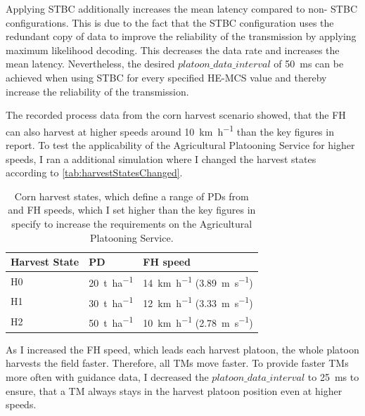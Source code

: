 Applying \ac{STBC} additionally increases the mean latency compared to
non- \ac{STBC} configurations.
This is due to the fact that the \ac{STBC} configuration uses the redundant copy of data to
improve the reliability of the transmission by applying maximum likelihood decoding.
This decreases the data rate and increases
the mean latency.
Nevertheless, the desired $platoon\_data\_interval$ of \SI{50}{\milli\second} can be achieved when using \ac{STBC} for
every specified \ac{HE}-\ac{MCS} value and thereby increase the reliability of the transmission.

The recorded process data from the corn harvest scenario showed, that the \ac{FH} can also harvest at higher speeds around
\SI{10}{\kilo\meter\per\hour} than the key figures in \cite{faustzahlen2018} report.
To test the applicability of the Agricultural Platooning Service for higher speeds, I ran a additional simulation where I changed the
harvest states according to \autoref{tab:harvestStatesChanged}.

\begin{table}[H]
	\centering
	\begin{tabular}{>{\centering}p{2cm}p{4cm}p{4cm}}
		\toprule
		Harvest State & \ac{PD} & \ac{FH} speed\\
		\midrule
		H0 & \SI{20}{\tonne\per\hectare}
        & \SI{14}{\kilo\metre\per\hour} (\SI{3.89}{\metre\per\second}) \\
		H1 & \SI{30}{\tonne\per\hectare}
        & \SI{12}{\kilo\metre\per\hour} (\SI{3.33}{\metre\per\second}) \\
		H2 & \SI{50}{\tonne\per\hectare}
        & \SI{10}{\kilo\metre\per\hour} (\SI{2.78}{\metre\per\second}) \\
		\bottomrule
	\end{tabular}
	\caption{Corn harvest states, which define a range of \acf{PD}s from \cite{faustzahlen2018} and \acf{FH} speeds, which I set higher than the key figures in \cite{faustzahlen2018} specify to
	increase the requirements on the Agricultural Platooning Service.}
	\label{tab:harvestStatesChanged}
\end{table}

As I increased the \ac{FH} speed, which leads each harvest platoon, the whole platoon harvests the field faster.
Therefore, all \ac{TM}s move faster.
To provide faster \ac{TM}s more often with guidance data,
I decreased the $platoon\_data\_interval$ to \SI{25}{\milli\second} to ensure,
that a \ac{TM} always stays in the harvest platoon position even at higher speeds.


